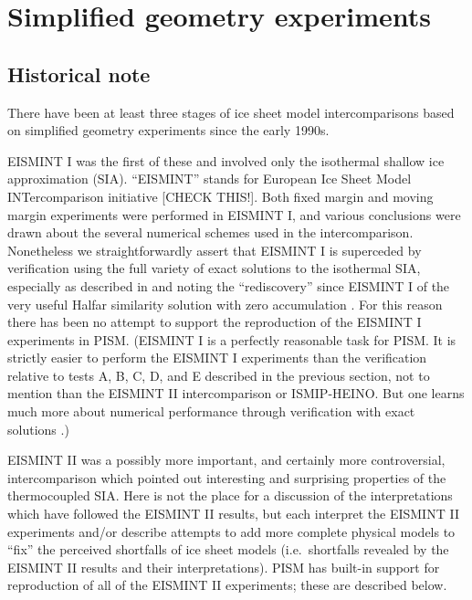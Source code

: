 \documentclass[11pt,final]{amsart}
\begin{document}
\clearpage\newpage
\section{Simplified geometry experiments}\label{sect:simp}

\subsection{Historical note}  There have been at least three stages of ice sheet model intercomparisons based on simplified geometry experiments since the early 1990s.

EISMINT I \cite{EISMINT96} was the first of these and involved only the isothermal shallow ice approximation (SIA).  ``EISMINT'' stands for European Ice Sheet Model INTercomparison initiative [CHECK THIS!].  Both fixed margin and moving margin experiments were performed in EISMINT I, and various conclusions were drawn about the several numerical schemes used in the intercomparison.  Nonetheless we straightforwardly assert that EISMINT I is superceded by verification using the full variety of exact solutions to the isothermal SIA, especially as described in \cite{BLKCB} and noting the ``rediscovery'' since EISMINT I of the very useful Halfar similarity solution with zero accumulation \cite{Halfar83}.  For this reason there has been no attempt to support the reproduction of the EISMINT I experiments in PISM.  (EISMINT I is a perfectly reasonable task for PISM.  It is strictly easier to perform the EISMINT I experiments than the verification relative to tests A, B, C, D, and E described in the previous section, not to mention than the EISMINT II intercomparison or ISMIP-HEINO.  But one learns much more about numerical performance through verification with exact solutions \cite{BLKCB}.)

EISMINT II \cite{EISMINT00} was a possibly more important, and certainly more controversial, intercomparison which pointed out interesting and surprising properties of the thermocoupled SIA.  Here is not the place for a discussion of the interpretations which have followed the EISMINT II results, but \cite{BBL,Hindmarsh04,Hindmarsh06,PayneBaldwin,SaitoEISMINT} each interpret the EISMINT II experiments and/or describe attempts to add more complete physical models to ``fix'' the perceived shortfalls of ice sheet models (i.e.~shortfalls revealed by the EISMINT II results and their interpretations).  PISM has built-in support for reproduction of all of the EISMINT II experiments; these are described below.
\end{document}
